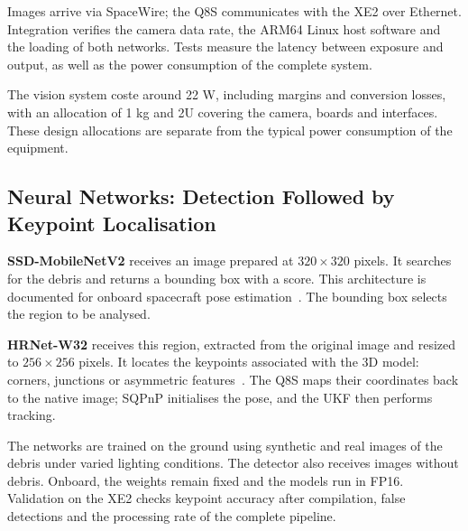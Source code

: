 Images arrive via SpaceWire; the Q8S communicates with the XE2 over Ethernet. Integration verifies the camera data rate, the ARM64 Linux host software and the loading of both networks. Tests measure the latency between exposure and output, as well as the power consumption of the complete system.

The vision system coste around 22 W, including margins and conversion losses, with an allocation of 1 kg and 2U covering the camera, boards and interfaces. These design allocations are separate from the typical power consumption of the equipment.

\subsection{Neural Networks: Detection Followed by Keypoint Localisation}
\textbf{SSD-MobileNetV2} receives an image prepared at $320\times320$ pixels. It searches for the debris and returns a bounding box with a score. This architecture is documented for onboard spacecraft pose estimation~\cite{black2021pose}. The bounding box selects the region to be analysed.

\textbf{HRNet-W32} receives this region, extracted from the original image and resized to $256\times256$ pixels. It locates the keypoints associated with the 3D model: corners, junctions or asymmetric features~\cite{fanizza2023pose}. The Q8S maps their coordinates back to the native image; SQPnP initialises the pose, and the UKF then performs tracking.

The networks are trained on the ground using synthetic and real images of the debris under varied lighting conditions. The detector also receives images without debris. Onboard, the weights remain fixed and the models run in FP16. Validation on the XE2 checks keypoint accuracy after compilation, false detections and the processing rate of the complete pipeline.

